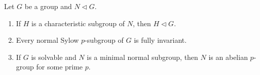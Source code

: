 Let $G$ be a group and $N \triangleleft G$.
\begin{enumerate}
\item[(i)] If $H$ is a characteristic subgroup of $N$, then $H \triangleleft G$.
\item[(ii)] Every normal Sylow $p$-subgroup of $G$ is fully invariant.
\item[(iii)] If $G$ is solvable and $N$ is a minimal normal subgroup, then $N$ is an abelian $p$-group for some prime $p$.
\end{enumerate}
